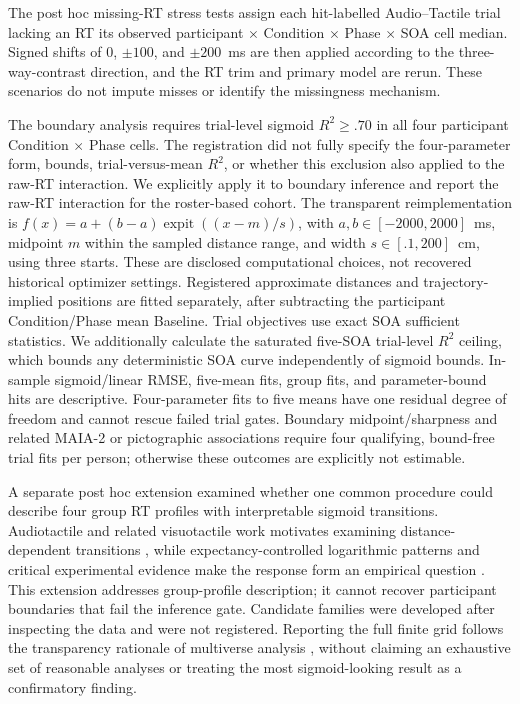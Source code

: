 The post hoc missing-RT stress tests assign each hit-labelled Audio--Tactile trial lacking an RT its observed participant $\times$ Condition $\times$ Phase $\times$ SOA cell median. Signed shifts of 0, $\pm100$, and $\pm200$~ms are then applied according to the three-way-contrast direction, and the RT trim and primary model are rerun. These scenarios do not impute misses or identify the missingness mechanism.

The boundary analysis requires trial-level sigmoid $R^2\geq .70$ in all four participant Condition $\times$ Phase cells. The registration did not fully specify the four-parameter form, bounds, trial-versus-mean $R^2$, or whether this exclusion also applied to the raw-RT interaction. We explicitly apply it to boundary inference and report the raw-RT interaction for the roster-based cohort. The transparent reimplementation is $f(x)=a+(b-a)\operatorname{expit}((x-m)/s)$, with $a,b\in[-2000,2000]$~ms, midpoint $m$ within the sampled distance range, and width $s\in[.1,200]$~cm, using three starts. These are disclosed computational choices, not recovered historical optimizer settings. Registered approximate distances and trajectory-implied positions are fitted separately, after subtracting the participant Condition/Phase mean Baseline. Trial objectives use exact SOA sufficient statistics. We additionally calculate the saturated five-SOA trial-level $R^2$ ceiling, which bounds any deterministic SOA curve independently of sigmoid bounds. In-sample sigmoid/linear RMSE, five-mean fits, group fits, and parameter-bound hits are descriptive. Four-parameter fits to five means have one residual degree of freedom and cannot rescue failed trial gates. Boundary midpoint/sharpness and related MAIA-2 or pictographic associations require four qualifying, bound-free trial fits per person; otherwise these outcomes are explicitly not estimable.

A separate post hoc extension examined whether one common procedure could describe four group RT profiles with interpretable sigmoid transitions. Audiotactile and related visuotactile work motivates examining distance-dependent transitions \citep{canzoneri2012dynamic,noel2020rapid}, while expectancy-controlled logarithmic patterns and critical experimental evidence make the response form an empirical question \citep{hobeika2019capturing,holmes2020sounds}. This extension addresses group-profile description; it cannot recover participant boundaries that fail the inference gate. Candidate families were developed after inspecting the data and were not registered. Reporting the full finite grid follows the transparency rationale of multiverse analysis \citep{Steegen2016}, without claiming an exhaustive set of reasonable analyses or treating the most sigmoid-looking result as a confirmatory finding.

